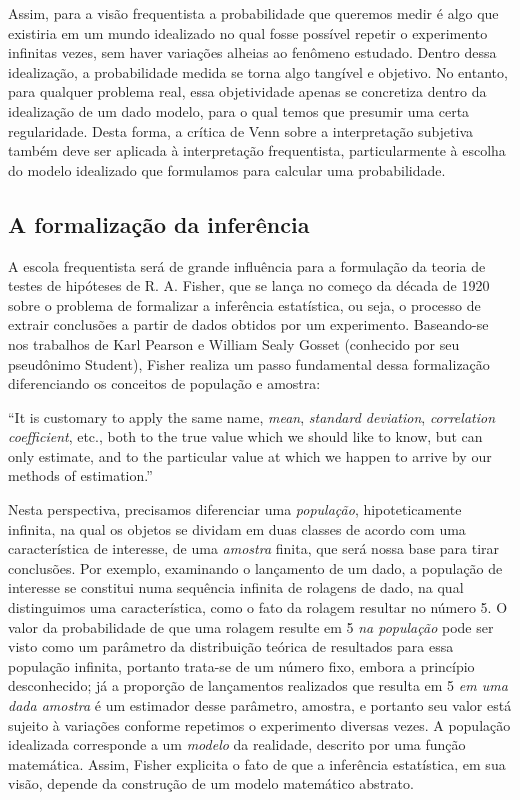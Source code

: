 \documentclass[12pt,a4paper]{article}
\begin{document}
Assim, para a visão frequentista a probabilidade que queremos medir é algo que existiria em um mundo idealizado no qual fosse
possível repetir o experimento infinitas vezes, sem haver variações alheias ao fenômeno estudado. Dentro dessa idealização,
a probabilidade medida se torna algo tangível e objetivo. No entanto, para qualquer problema real, essa objetividade
apenas se concretiza dentro da idealização de um dado modelo, para o qual temos que presumir uma certa regularidade. Desta
forma, a crítica de Venn sobre a interpretação subjetiva também deve ser aplicada à interpretação frequentista, particularmente
à escolha do modelo idealizado que formulamos para calcular uma probabilidade.

\subsection{A formalização da inferência}

A escola frequentista será de grande influência para a formulação da teoria de testes de hipóteses de R. A. Fisher, que se
lança no começo da década de 1920 sobre o problema de formalizar a inferência estatística, ou seja, o processo de
extrair conclusões a partir de dados obtidos por um experimento. Baseando-se nos trabalhos de Karl Pearson e William Sealy Gosset
(conhecido por seu pseudônimo Student), Fisher realiza um passo fundamental dessa formalização
diferenciando os conceitos de população e amostra:

``It is customary to apply the same name, {\em mean}, {\em standard deviation}, {\em correlation coefficient}, etc., both 
to the true value which we should like to know, but can only estimate, and to the particular value at which we happen 
to arrive by our methods of estimation.''\cite{Fisher1922}

Nesta perspectiva, precisamos diferenciar uma {\em população}, hipoteticamente infinita, na qual os objetos se dividam em duas
classes de acordo com uma característica de interesse, de uma {\em amostra} finita, que será nossa base para tirar conclusões.
Por exemplo, examinando o lançamento de um dado, a população de interesse se constitui numa sequência infinita de rolagens
de dado, na qual distinguimos uma característica, como o fato da rolagem resultar no número 5. O valor da probabilidade de que
uma rolagem resulte em 5 {\em na população} pode ser visto como um parâmetro da distribuição teórica de resultados para essa
população infinita, portanto trata-se de um número fixo, embora a princípio desconhecido; 
já a proporção de lançamentos realizados que resulta em 5 {\em em uma dada amostra} é um estimador desse parâmetro,
amostra, e portanto seu valor está sujeito à variações conforme repetimos o experimento diversas vezes.
A população idealizada corresponde a um {\em modelo} da realidade, descrito por uma função matemática.
Assim, Fisher explicita o fato de que a inferência estatística, em sua visão, depende da construção de um modelo matemático
abstrato.
\end{document}
